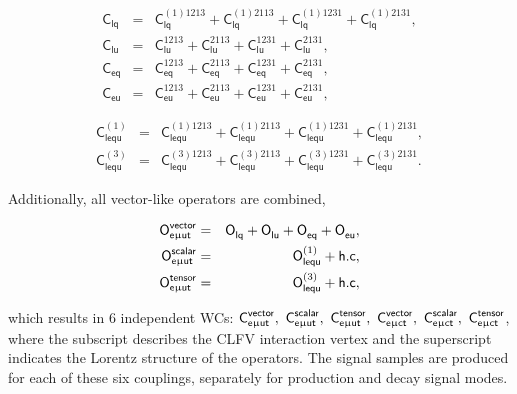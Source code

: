 \begin{eqnarray}
\label{eq:1:0}
 \textsf{C}_{\textsf{lq}}
 &=& \textsf{C}_{\textsf{lq}}^{(1)1213}
 + \textsf{C}_{\textsf{lq}}^{(1)2113}
 + \textsf{C}_{\textsf{lq}}^{(1)1231}
 + \textsf{C}_{\textsf{lq}}^{(1)2131}
 ,\\
\label{eq1:1}
 \textsf{C}_{\textsf{lu}}  
 &=& \textsf{C}_{\textsf{lu}}^{1213}
 + \textsf{C}_{\textsf{lu}}^{2113}
 + \textsf{C}_{\textsf{lu}}^{1231}
 + \textsf{C}_{\textsf{lu}}^{2131}
 ,\\
 \label{eq:1:2}
 \textsf{C}_{\textsf{eq}}
 &=& \textsf{C}_{\textsf{eq}}^{1213}
 + \textsf{C}_{\textsf{eq}}^{2113}
 + \textsf{C}_{\textsf{eq}}^{1231}
 + \textsf{C}_{\textsf{eq}}^{2131}
 ,\\
 \label{eq:1:3}
 \textsf{C}_{\textsf{eu}}  
 &=& \textsf{C}_{\textsf{eu}}^{1213}
 + \textsf{C}_{\textsf{eu}}^{2113}
 + \textsf{C}_{\textsf{eu}}^{1231}
 + \textsf{C}_{\textsf{eu}}^{2131},
\end{eqnarray}

\begin{eqnarray}
\label{eq:1:4}
 \textsf{C}_{\textsf{lequ}}^{(1)}  
 &=& \textsf{C}_{\textsf{lequ}}^{(1)1213}
 + \textsf{C}_{\textsf{lequ}}^{(1)2113}
 + \textsf{C}_{\textsf{lequ}}^{(1)1231}
 + \textsf{C}_{\textsf{lequ}}^{(1)2131}
 ,\\
\label{eq:1:5}
 \textsf{C}_{\textsf{lequ}}^{(3)}
 &=& \textsf{C}_{\textsf{lequ}}^{(3)1213}
 + \textsf{C}_{\textsf{lequ}}^{(3)2113}
 + \textsf{C}_{\textsf{lequ}}^{(3)1231}
 + \textsf{C}_{\textsf{lequ}}^{(3)2131}. 
\end{eqnarray}

Additionally, all vector-like operators are combined,

\begin{eqnarray}
\label{eq:1:6}
 \textsf{O}^{\textsf{vector}}_{\textsf{e}\upmu\textsf{{u}t}}&=&\textsf{O}^{}_{\textsf{lq}}+\textsf{O}^{}_{\textsf{lu}}+\textsf{O}^{}_{\textsf{eq}}+\textsf{O}^{}_{\textsf{eu}},\\
\label{eq:1:7}
 \textsf{O}^{\textsf{scalar}}_{\textsf{e}\upmu\textsf{{u}t}}&=&\textsf{O}^{(1)}_{\textsf{lequ}}+\textsf{h.c},\\
\label{eq:1:8}
 \textsf{O}^{\textsf{tensor}}_{\textsf{e}\upmu\textsf{{u}t}}&=&\textsf{O}^{(3)}_{\textsf{lequ}}+\textsf{h.c},
\end{eqnarray}

which results in 6 independent \acp{WC}: $\textsf{C}^{\textsf{vector}}_{\textsf{e}\upmu\textsf{{u}t}},~\textsf{C}^{\textsf{scalar}}_{\textsf{e}\upmu\textsf{{u}t}},~\textsf{C}^{\textsf{tensor}}_{\textsf{e}\upmu\textsf{{u}t}},~\textsf{C}^{\textsf{vector}}_{\textsf{e}\upmu\textsf{{c}t}},~\textsf{C}^{\textsf{scalar}}_{\textsf{e}\upmu\textsf{{c}t}},~\textsf{C}^{\textsf{tensor}}_{\textsf{e}\upmu\textsf{{c}t}}$, where the subscript describes the \ac{CLFV} interaction vertex and the superscript indicates the Lorentz structure of the operators. The signal samples are produced for each of these six couplings, separately for production and decay signal modes.

